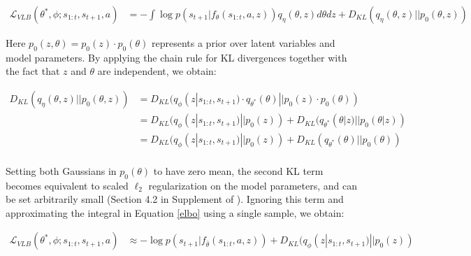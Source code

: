 \documentclass{article} %
\begin{document}


\begin{align}
  \mathcal{L}_{VLB}(\theta^*, \phi; s_{1:t}, s_{t+1}, a) &= -\int \log p(s_{t+1} | f_\theta(s_{1:t}, a, z)) q_\eta(\theta, z) d\theta dz +  D_{KL}(q_\eta(\theta, z) || p_0(\theta, z))
  \label{elbo}
\end{align}

Here $p_0(z, \theta) = p_0(z) \cdot p_0(\theta)$ represents a prior over latent variables and model parameters. By applying the chain rule for KL divergences together with the fact that $z$ and $\theta$ are independent, we obtain:

\begin{align*}
D_{KL}(q_\eta(\theta, z) || p_0(\theta, z)) &= D_{KL}(q_\phi(z | s_{1:t}, s_{t+1}) \cdot q_{\theta^*}(\theta) || p_0(z) \cdot p_0(\theta)) \\
&= D_{KL}(q_\phi(z | s_{1:t}, s_{t+1}) || p_0(z)) + D_{KL}(q_{\theta^*}(\theta | z) || p_0(\theta | z))  \\
&= D_{KL}(q_\phi(z | s_{1:t}, s_{t+1}) || p_0(z)) + D_{KL}(q_{\theta^*}(\theta) || p_0(\theta))  \\
\end{align*}

Setting both Gaussians in $p_0(\theta)$ to have zero mean, the second KL term becomes equivalent to scaled $\ell_2$ regularization on the model parameters, and can be set arbitrarily small (Section 4.2 in Supplement of \citep{Gal16}). 
Ignoring this term and approximating the integral in Equation \ref{elbo} using a single sample, we obtain:

\begin{align*}
  \mathcal{L}_{VLB}(\theta^*, \phi; s_{1:t}, s_{t+1}, a) &\approx -\log p(s_{t+1} | f_{\bar{\theta}}(s_{1:t}, a, z)) + D_{KL}(q_\phi(z | s_{1:t}, s_{t+1}) || p_0(z)) 
\end{align*}
\end{document}
